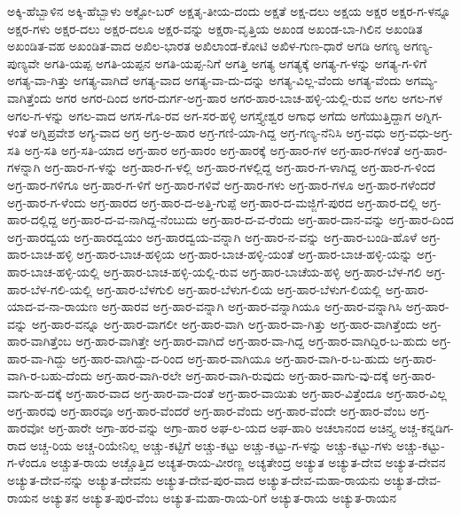 ಅಕ್ಕಿ-ಹೆಬ್ಬಾಳಿನ
ಅಕ್ಕಿ-ಹೆಬ್ಬಾಳು
ಅಕ್ಟೋ-ಬರ್
ಅಕ್ಷತೃ-ತೀಯ-ದಂದು
ಅಕ್ಷತೆ
ಅಕ್ಷ-ದಲು
ಅಕ್ಷಯ
ಅಕ್ಷರ
ಅಕ್ಷರ-ಗ-ಳನ್ನೂ
ಅಕ್ಷರ-ಗಳು
ಅಕ್ಷರ-ದಲು
ಅಕ್ಷರ-ದಲೂ
ಅಕ್ಷರ-ವನ್ನು
ಅಕ್ಷರಾ-ವೃತ್ತಿಯ
ಅಖಂಡ
ಅಖಂಡ-ಬಾ-ಗಿಲಿನ
ಅಖಂಡಿತ
ಅಖಂಡಿತ-ವಹ
ಅಖಂಡಿತ-ವಾದ
ಅಖಿಲ-ಭಾರತ
ಅಖಿಲಾಂಡ-ಕೋಟಿ
ಅಖಿಳ-ಗುಣ-ಧಾರೆ
ಅಗಡಿ
ಅಗಣ್ಯ
ಅಗಣ್ಯ-ಪುಣ್ಯವೇ
ಅಗತಿ-ಯಪ್ಪ
ಅಗತಿ-ಯಪ್ಪನ
ಅಗತಿ-ಯಪ್ಪ-ನಿಗೆ
ಅಗತ್ತಿ
ಅಗತ್ಯ
ಅಗತ್ಯಕ್ಕೆ
ಅಗತ್ಯ-ಗ-ಳನ್ನು
ಅಗತ್ಯ-ಗ-ಳಿಗೆ
ಅಗತ್ಯ-ವಾ-ಗಿತ್ತು
ಅಗತ್ಯ-ವಾಗಿದೆ
ಅಗತ್ಯ-ವಾದ
ಅಗತ್ಯ-ವಾ-ದು-ದನ್ನು
ಅಗತ್ಯ-ವಿಲ್ಲ-ವೆಂದು
ಅಗತ್ಯ-ವೆಂದು
ಅಗಮ್ಯ-ವಾಗಿತ್ತೆಂದು
ಅಗರ
ಅಗರ-ದಿಂದ
ಅಗರ-ದುರ್ಗ-ಅಗ್ರ-ಹಾರ
ಅಗರ-ಹಾರ-ಬಾಚ-ಹಳ್ಳಿ-ಯಲ್ಲಿ-ರುವ
ಅಗಲ
ಅಗಲ-ಗಳ
ಅಗಲ-ಗ-ಳನ್ನು
ಅಗಲ-ವಾದ
ಅಗಸ-ಗೊ-ರವ
ಅಗ-ಸರ-ಹಳ್ಳಿ
ಅಗಸ್ತ್ಯೇಶ್ವರ
ಅಗಾಧ
ಅಗೆದು
ಅಗೆಯುತ್ತಿದ್ದಾಗ
ಅಗ್ನಿಗ-ಳಂತೆ
ಅಗ್ನಿಪ್ರವೇಶ
ಅಗ್ಯ-ವಾದ
ಅಗ್ರ
ಅಗ್ರ-ಅ-ಹಾರ
ಅಗ್ರ-ಗಣಿ-ಯಾ-ಗಿದ್ದ
ಅಗ್ರ-ಗಣ್ಯ-ನೆನಿಸಿ
ಅಗ್ರ-ವಧು
ಅಗ್ರ-ವಧು-ಅಗ್ರ-ಸತಿ
ಅಗ್ರ-ಸತಿ
ಅಗ್ರ-ಸತಿ-ಯಾದ
ಅಗ್ರ-ಹಾರ
ಅಗ್ರ-ಹಾರಂ
ಅಗ್ರ-ಹಾರಕ್ಕೆ
ಅಗ್ರ-ಹಾರ-ಗಳ
ಅಗ್ರ-ಹಾರ-ಗಳಂತೆ
ಅಗ್ರ-ಹಾರ-ಗಳನ್ನಾಗಿ
ಅಗ್ರ-ಹಾರ-ಗ-ಳನ್ನು
ಅಗ್ರ-ಹಾರ-ಗ-ಳಲ್ಲಿ
ಅಗ್ರ-ಹಾರ-ಗಳಲ್ಲಿದ್ದ
ಅಗ್ರ-ಹಾರ-ಗ-ಳಾಗಿದ್ದ
ಅಗ್ರ-ಹಾರ-ಗ-ಳಿಂದ
ಅಗ್ರ-ಹಾರ-ಗಳಿಗೂ
ಅಗ್ರ-ಹಾರ-ಗ-ಳಿಗೆ
ಅಗ್ರ-ಹಾರ-ಗಳಿವೆ
ಅಗ್ರ-ಹಾರ-ಗಳು
ಅಗ್ರ-ಹಾರ-ಗಳೂ
ಅಗ್ರ-ಹಾರ-ಗಳೆಂದರೆ
ಅಗ್ರ-ಹಾರ-ಗ-ಳೆಂದು
ಅಗ್ರ-ಹಾರದ
ಅಗ್ರ-ಹಾರ-ದ-ಅತ್ತಿ-ಗುಪ್ಪೆ
ಅಗ್ರ-ಹಾರ-ದ-ಮಜ್ಜಿಗೆ-ಪುರದ
ಅಗ್ರ-ಹಾರ-ದಲ್ಲಿ
ಅಗ್ರ-ಹಾರ-ದಲ್ಲಿದ್ದ
ಅಗ್ರ-ಹಾರ-ದ-ವ-ನಾಗಿದ್ದ-ನೆಂಬುದು
ಅಗ್ರ-ಹಾರ-ದ-ವ-ರೆಂದು
ಅಗ್ರ-ಹಾರ-ದಾನ-ವನ್ನು
ಅಗ್ರ-ಹಾರ-ದಿಂದ
ಅಗ್ರ-ಹಾರದ್ವಯ
ಅಗ್ರ-ಹಾರದ್ವಯಂ
ಅಗ್ರ-ಹಾರದ್ವಯ-ವನ್ನಾಗಿ
ಅಗ್ರ-ಹಾರ-ನ-ವನ್ನು
ಅಗ್ರ-ಹಾರ-ಬಂಡಿ-ಹೊಳೆ
ಅಗ್ರ-ಹಾರ-ಬಾಚ-ಹಳ್ಳಿ
ಅಗ್ರ-ಹಾರ-ಬಾಚ-ಹಳ್ಳಿಯ
ಅಗ್ರ-ಹಾರ-ಬಾಚ-ಹಳ್ಳಿ-ಯಂತೆ
ಅಗ್ರ-ಹಾರ-ಬಾಚ-ಹಳ್ಳಿ-ಯನ್ನು
ಅಗ್ರ-ಹಾರ-ಬಾಚ-ಹಳ್ಳಿ-ಯಲ್ಲಿ
ಅಗ್ರ-ಹಾರ-ಬಾಚ-ಹಳ್ಳಿ-ಯಲ್ಲಿ-ರುವ
ಅಗ್ರ-ಹಾರ-ಬಾಚೆಯ-ಹಳ್ಳಿ
ಅಗ್ರ-ಹಾರ-ಬೆಳ-ಗಲಿ
ಅಗ್ರ-ಹಾರ-ಬೆಳ-ಗಲಿ-ಯಲ್ಲಿ
ಅಗ್ರ-ಹಾರ-ಬೆಳಗುಲಿ
ಅಗ್ರ-ಹಾರ-ಬೆಳುಗ-ಲಿಯ
ಅಗ್ರ-ಹಾರ-ಬೆಳುಗ-ಲಿಯಲ್ಲಿ
ಅಗ್ರ-ಹಾರ-ಯಾದ-ವ-ನಾ-ರಾಯಣ
ಅಗ್ರ-ಹಾರವ
ಅಗ್ರ-ಹಾರ-ವನ್ನಾಗಿ
ಅಗ್ರ-ಹಾರ-ವನ್ನಾಗಿಯೂ
ಅಗ್ರ-ಹಾರ-ವನ್ನಾಗಿಸಿ
ಅಗ್ರ-ಹಾರ-ವನ್ನು
ಅಗ್ರ-ಹಾರ-ವನ್ನೂ
ಅಗ್ರ-ಹಾರ-ವಾಗಲೀ
ಅಗ್ರ-ಹಾರ-ವಾಗಿ
ಅಗ್ರ-ಹಾರ-ವಾ-ಗಿತ್ತು
ಅಗ್ರ-ಹಾರ-ವಾಗಿತ್ತೆಂದು
ಅಗ್ರ-ಹಾರ-ವಾಗಿತ್ತೆಂಬ
ಅಗ್ರ-ಹಾರ-ವಾಗಿತ್ತೇ
ಅಗ್ರ-ಹಾರ-ವಾಗಿದೆ
ಅಗ್ರ-ಹಾರ-ವಾ-ಗಿದ್ದ
ಅಗ್ರ-ಹಾರ-ವಾಗಿದ್ದಿರ-ಬ-ಹುದು
ಅಗ್ರ-ಹಾರ-ವಾ-ಗಿದ್ದು
ಅಗ್ರ-ಹಾರ-ವಾಗಿದ್ದು-ದ-ರಿಂದ
ಅಗ್ರ-ಹಾರ-ವಾಗಿಯೂ
ಅಗ್ರ-ಹಾರ-ವಾಗಿ-ರ-ಬ-ಹುದು
ಅಗ್ರ-ಹಾರ-ವಾಗಿ-ರ-ಬಹು-ದೆಂದು
ಅಗ್ರ-ಹಾರ-ವಾಗಿ-ರಲೇ
ಅಗ್ರ-ಹಾರ-ವಾಗಿ-ರುವುದು
ಅಗ್ರ-ಹಾರ-ವಾಗು-ವು-ದಕ್ಕೆ
ಅಗ್ರ-ಹಾರ-ವಾಗು-ಹ-ದಕ್ಕೆ
ಅಗ್ರ-ಹಾರ-ವಾದ
ಅಗ್ರ-ಹಾರ-ವಾ-ದಂತೆ
ಅಗ್ರ-ಹಾರ-ವಾಯಿತು
ಅಗ್ರ-ಹಾರ-ವಿತ್ತೆಂದೂ
ಅಗ್ರ-ಹಾರ-ವಿಲ್ಲ
ಅಗ್ರ-ಹಾರವು
ಅಗ್ರ-ಹಾರವೂ
ಅಗ್ರ-ಹಾರ-ವೆಂದರೆ
ಅಗ್ರ-ಹಾರ-ವೆಂದು
ಅಗ್ರ-ಹಾರ-ವೆಂದೇ
ಅಗ್ರ-ಹಾರ-ವೆಂಬ
ಅಗ್ರ-ಹಾರವೋ
ಅಗ್ರ-ಹಾರೇ
ಅಗ್ರಾ-ಹರ-ವನ್ನು
ಅಗ್ರಾ-ಹಾರ
ಅಘ-ಲ-ಯದ
ಅಘ-ಹಾರಿ
ಅಚಲಾನಂದ
ಅಚಿನ್ತ್ಯ
ಅಚ್ಚ-ಕನ್ನಡಿಗ-ರಾದ
ಅಚ್ಚ-ರಿಯ
ಅಚ್ಚ-ರಿಯೇನಿಲ್ಲ
ಅಚ್ಚು-ಕಟ್ಟಿಗೆ
ಅಚ್ಚು-ಕಟ್ಟು
ಅಚ್ಚು-ಕಟ್ಟು-ಗ-ಳನ್ನು
ಅಚ್ಚು-ಕಟ್ಟು-ಗಳು
ಅಚ್ಚು-ಕಟ್ಟು-ಗ-ಳೆಂದೂ
ಅಚ್ಚುತ-ರಾಯ
ಅಚ್ಚೊತ್ತಿದ
ಅಚ್ಯತ-ರಾಯ-ವೀರಣ್ಣ
ಅಚ್ಯತೇಂದ್ರ
ಅಚ್ಯುತ
ಅಚ್ಯುತ-ದೇವ
ಅಚ್ಯುತ-ದೇವನ
ಅಚ್ಯುತ-ದೇವ-ನನ್ನು
ಅಚ್ಯುತ-ದೇವನು
ಅಚ್ಯುತ-ದೇವ-ಪುರ-ವಾದ
ಅಚ್ಯುತ-ದೇವ-ಮಹಾ-ರಾಯನು
ಅಚ್ಯುತ-ದೇವ-ರಾಯನ
ಅಚ್ಯುತನ
ಅಚ್ಯುತ-ಪುರ-ವೆಂಬ
ಅಚ್ಯುತ-ಮಹಾ-ರಾಯ-ರಿಗೆ
ಅಚ್ಯುತ-ರಾಯ
ಅಚ್ಯುತ-ರಾಯನ
